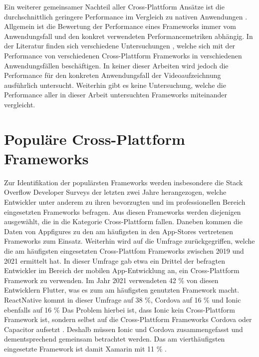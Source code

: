 Ein weiterer gemeinsamer Nachteil aller Cross-Plattform Ansätze ist die durchschnittlich geringere Performance im Vergleich zu nativen Anwendungen \cite{Que_Comparison_Hybrid_Native, Pinto_Native_to_Cross_Platform}.
Allgemein ist die Bewertung der Performance eines Frameworks immer vom Anwendungsfall und den konkret verwendeten Performancemetriken abhängig.
In der Literatur finden sich verschiedene Untersuchungen \cite{Nawrocki_Comparison_Hybrid_Native_Frameworks,Biorn-Hansen_PerformanceOverhead_CrossPlatform}, welche sich mit der Performance von verschiedenen Cross-Plattform Frameworks in verschiedenen Anwendungsfällen beschäftigen.
In keiner dieser Arbeiten wird jedoch die Performance für den konkreten Anwendungsfall der Videoaufzeichnung ausführlich untersucht.
Weiterhin gibt es keine Untersuchung, welche die Performance aller in dieser Arbeit untersuchten Frameworks miteinander vergleicht.



\section{Populäre Cross-Plattform Frameworks}
\label{sec:Frameworks_Auswahl}
Zur Identifikation der populärsten Frameworks werden insbesondere die Stack Overflow Developer Surveys der letzten zwei Jahre \cite{Stackoverflow_2021} \cite{Stackoverflow_2022} herangezogen, welche Entwickler unter anderem zu ihren bevorzugten und im professionellen Bereich eingesetzten Frameworks befragen.
Aus diesen Frameworks werden diejenigen ausgewählt, die in die Kategorie Cross-Plattform fallen.
Daneben kommen die Daten von Appfigures zu den am häufigsten in den App-Stores vertretenen Frameworks \cite{Appfigures_TopSDKs} zum Einsatz.
Weiterhin wird auf die Umfrage \cite{Statista_UsedCrossPlatformFrameworks} zurückgegriffen, welche die am häufigsten eingesetzten Cross-Plattfom Frameworks zwischen 2019 und 2021 ermittelt hat.
In dieser Umfrage gab etwa ein Drittel der befragten Entwickler im Bereich der mobilen App-Entwicklung an, ein Cross-Plattform Framework zu verwenden.
Im Jahr 2021 verwendeten 42 \% von diesen Entwicklern Flutter, was es zum am häufigsten genutzten Framework macht.
ReactNative kommt in dieser Umfrage auf 38 \%, Cordova auf 16 \% und Ionic ebenfalls auf 16 \%
Das Problem hierbei ist, dass Ionic kein Cross-Plattform Framework ist, sondern selbst auf die Cross-Plattform Frameworks Cordova oder Capacitor aufsetzt \cite{Ionic_Docs}.
Deshalb müssen Ionic und Cordova zusammengefasst und dementsprechend gemeinsam betrachtet werden.
Das am vierthäufigsten eingesetzte Framework ist damit Xamarin mit 11 \% \cite{Statista_UsedCrossPlatformFrameworks}.

